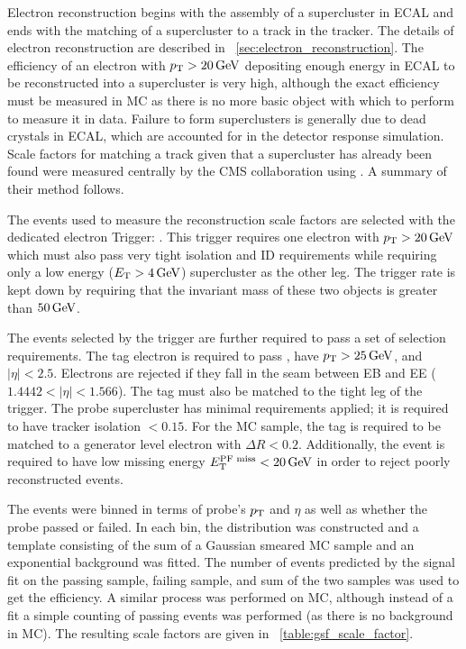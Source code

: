 Electron reconstruction begins with the assembly of a supercluster in ECAL and
ends with the matching of a supercluster to a track in the tracker. The details
of electron reconstruction are described in
\SEC~\ref{sec:electron_reconstruction}. The efficiency of an electron with $p_{\mathrm{T}}
> 20 \,\text{Ge\hspace{-.08em}V}$ depositing enough energy in ECAL to be reconstructed into a
supercluster is very high, although the exact efficiency must be measured in
MC as there is no more basic object with which to perform \TnP to measure it in
data. Failure to form superclusters is generally due to dead crystals in ECAL,
which are accounted for in the detector response simulation. Scale factors for
matching a track given that a supercluster has already been found were measured
centrally by the CMS collaboration using \TnP \cite{gsf_scale_factors_2013}. A
summary of their method follows.

The events used to measure the reconstruction scale factors are selected with the
dedicated electron \TnP Trigger: \TnPTrigger. This trigger requires one
electron with $p_{\mathrm{T}} > 20 \,\text{Ge\hspace{-.08em}V}$ which must also pass very tight isolation and ID
requirements while requiring only a low energy ($E_{\mathrm{T}} > 4 \,\text{Ge\hspace{-.08em}V}$) supercluster as
the other leg. The trigger rate is kept down by requiring that the invariant
mass of these two objects is greater than $50 \,\text{Ge\hspace{-.08em}V}$.

The events selected by the trigger are further required to pass a set of
selection requirements. The tag electron is required to pass \EGTIGHT, have
$p_{\mathrm{T}} > 25 \,\text{Ge\hspace{-.08em}V}$, and $|\eta| < 2.5$. Electrons are rejected if they fall in the
seam between EB and EE ($1.4442 < |\eta| < 1.566$). The tag must also be
matched to the tight leg of the \TnP trigger. The probe supercluster has
minimal requirements applied; it is required to have tracker isolation $<
0.15$. For the MC sample, the tag is required to be matched to a generator
level electron with $\Delta R < 0.2$. Additionally, the event is required to
have low \particleflow missing energy $E_{\mathrm{T}}^{\text{PF miss}} < 20 \,\text{Ge\hspace{-.08em}V}$ in order to reject
poorly reconstructed events.

The events were binned in terms of probe's $p_{\mathrm{T}}$ and $\eta$ as well as whether
the probe passed or failed. In each bin, the \mee distribution was constructed
and a template consisting of the sum of a Gaussian smeared \Ztoee MC sample and
an exponential background was fitted. The number of events predicted by the
signal fit on the passing sample, failing sample, and sum of the two samples
was used to get the efficiency. A similar process was performed on MC, although
instead of a fit a simple counting of passing events was performed (as there is
no background in MC). The resulting scale factors are given in
\TAB~\ref{table:gsf_scale_factor}.

